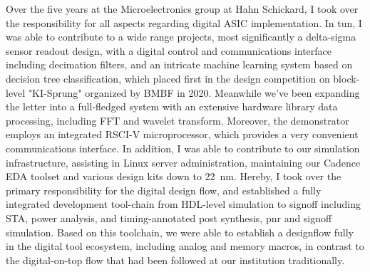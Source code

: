Over the five years at the Microelectronics group at Hahn Schickard, I took over the responsibility for all aspects regarding digital ASIC implementation. In tun, I was able to contribute to a wide range projects, most significantly a delta-sigma sensor readout design, with a digital control and communications interface including decimation filters, and an intricate machine learning system based on decision tree classification, which placed first in the design competition on block-level "KI-Sprung" organized by BMBF in 2020. Meanwhile we've been expanding the letter into a full-fledged system with an extensive hardware library data processing, including FFT and wavelet transform. Moreover, the demonstrator employs an integrated RSCI-V microprocessor, which provides a very convenient communications interface. %
In addition, I was able to contribute to our simulation infrastructure, assisting in Linux server administration, maintaining our Cadence EDA toolset and various design kits down to \SI{22}{\nano\metre}. Hereby, I took over the primary responsibility for the digital design flow, and established a fully integrated development tool-chain from HDL-level simulation to signoff including STA, power analysis, and timing-annotated post synthesis, pnr and signoff simulation. Based on this toolchain, we were able to establish a designflow fully in the digital tool ecosystem, including analog and memory macros, in contrast to the digital-on-top flow that had been followed at our institution traditionally.\par
